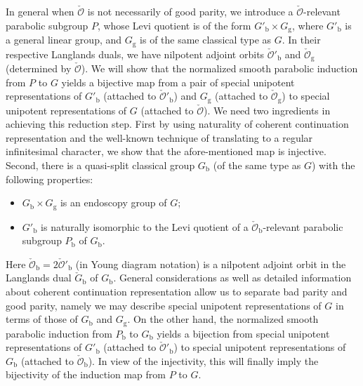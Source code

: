 \documentclass[12pt,a4paper]{amsart}
\newcommand{\CO}{{\mathcal {O}}}
\numberwithin{equation}{section}
\theoremstyle{remark}
\def\Gb{G_{\mathrm b}}
\def\Gpb{G'_{\mathrm b}}
\def\Gg{G_{\mathrm g}}
\begin{document}
In general when $\check \CO$ is not necessarily of good parity, we introduce a $\check \CO$-relevant parabolic subgroup $P$, whose Levi quotient is of the form
 $\Gpb\times \Gg $, where $\Gpb$ is a general linear group, and $\Gg$ is of the same classical type as $G$. In their respective Langlands duals, we have nilpotent adjoint orbits
$\check \CO'_\mathrm b$ and $\check \CO_\mathrm g$ (determined by $\check \CO$). We will show that the normalized smooth parabolic induction from $P$ to $G$ yields a bijective map from a pair of special unipotent representations of $\Gpb$ (attached to $\check \CO'_\mathrm b$) and $\Gg$ (attached to $\check \CO_\mathrm g$) to special unipotent representations of $G$ (attached to $\check \CO$). We need two ingredients in achieving this reduction step. First by using naturality of coherent continuation representation and the well-known technique of translating to a regular infinitesimal character, we show that the afore-mentioned map is injective. Second, there is a quasi-split classical group $\Gb$ (of the same type as $G$) with the following properties:
\begin{itemize}
\item $\Gb\times \Gg $ is an endoscopy group of $G$;
\item $\Gpb$ is naturally isomorphic to the Levi quotient of a $\check \CO_\mathrm b$-relevant parabolic subgroup $P_\mathrm b$ of $\Gb$.
\end{itemize}
Here $\check \CO_\mathrm b =2\check \CO'_\mathrm b$ (in Young diagram notation) is a nilpotent adjoint orbit in the Langlands dual $\check \Gb$ of $\Gb$.
General considerations as well as detailed information about coherent continuation representation allow us to separate bad parity and good parity, namely we may describe special unipotent representations of $G$ in terms of those of $\Gb$ and $\Gg$. On the other hand, the normalized smooth parabolic induction from $P_\mathrm b$ to $\Gb$ yields a bijection from special unipotent representations of $\Gpb$ (attached to $\check \CO'_\mathrm b$) to special unipotent representations of $\Gb$ (attached to $\check \CO_\mathrm b$). In view of the injectivity, this will finally imply the bijectivity of the induction map from $P$ to $G$.
\end{document}
